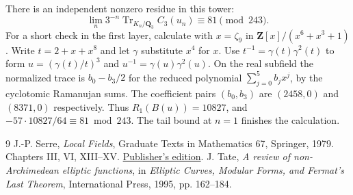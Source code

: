 \documentclass[11pt]{article}
\newcommand{\Z}{\mathbf Z}\newcommand{\Q}{\mathbf Q}
\begin{document}
There is an independent nonzero residue in this tower:
\[
 \lim_n 3^{-n}\operatorname{Tr}_{K_n/\Q_3} C_3(u_n)\equiv81\pmod {243}.
\]
For a short check in the first layer, calculate with $x=\zeta_9$ in
$\Z[x]/(x^6+x^3+1)$. Write $t=2+x+x^8$ and let $\gamma$ substitute $x^4$ for $x$. Use $t^{-1}=\gamma(t)\gamma^2(t)$ to form $u=(\gamma(t)/t)^3$ and $u^{-1}=\gamma(u)\gamma^2(u)$. On the real subfield the normalized trace is $b_0-b_3/2$ for the reduced polynomial $\sum_{j=0}^5 b_jx^j$, by the cyclotomic Ramanujan sums. The coefficient pairs $(b_0,b_3)$ are $(2458,0)$ and $(8371,0)$ respectively. Thus $R_1(B(u))=10827$, and $-57\cdot10827/64\equiv81\bmod243$. The tail bound at $n=1$ finishes the calculation.
\begin{thebibliography}{9}
 J.-P. Serre, \emph{Local Fields}, Graduate Texts in Mathematics 67, Springer, 1979. Chapters III, VI, XIII--XV. \href{https://doi.org/10.1007/978-1-4757-5673-9}{Publisher's edition}.
 J. Tate, \emph{A review of non-Archimedean elliptic functions}, in \emph{Elliptic Curves, Modular Forms, and Fermat's Last Theorem}, International Press, 1995, pp. 162--184.
\end{thebibliography}
\end{document}
